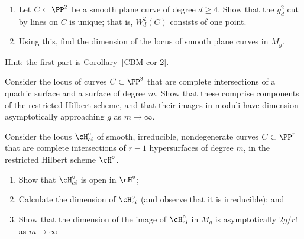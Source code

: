 \begin{exercise}\label{moduli of plane curves}
\begin{enumerate}
\item Let $C \subset \PP^2$ be a smooth plane curve of degree $d\geq 4$. Show that the $g^2_d$ cut by lines on $C$ is unique; that is, $W^2_d(C)$ consists of one point.
\item Using this, find the dimension of the locus of smooth plane curves in $M_g$.
\end{enumerate}

Hint: the first part is Corollary~\ref{CBM cor 2}.
\end{exercise}

\begin{exercise}\label{balanced ci}
Consider the locus of curves $C \subset \PP^3$ that are complete intersections of a quadric surface and a surface of degree $m$. Show that these comprise components of the restricted Hilbert scheme, and that their images in moduli have dimension asymptotically approaching $g$ as $m \to \infty$.
\end{exercise}

\begin{exercise}\label{balanced CI in higher codim}
Consider the locus $\cH^\circ_{ci}$ of smooth, irreducible, nondegenerate curves $C \subset \PP^r$ that are complete intersections of $r-1$ hypersurfaces of degree $m$, in the restricted Hilbert scheme $\cH^\circ$. 
\begin{enumerate}
\item Show that $\cH^\circ_{ci}$ is open in $\cH^\circ$;
\item Calculate the dimension of $\cH^\circ_{ci}$ (and observe that it is irreducible); and
\item Show that the dimension of the image of $\cH^\circ_{ci}$ in $M_g$ is asymptotically $2g/r!$ as $m \to \infty$
\end{enumerate}
\end{exercise}





